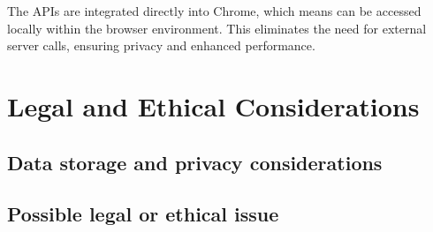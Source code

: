 \documentclass{article}
\begin{document}
The APIs are integrated directly into Chrome, which means can be accessed locally within the browser environment. This eliminates the need for external server calls, ensuring privacy and enhanced performance.

\section{Legal and Ethical Considerations}
\subsection{Data storage and privacy considerations}

\subsection{Possible legal or ethical issue}

\printglossaries
\end{document}
